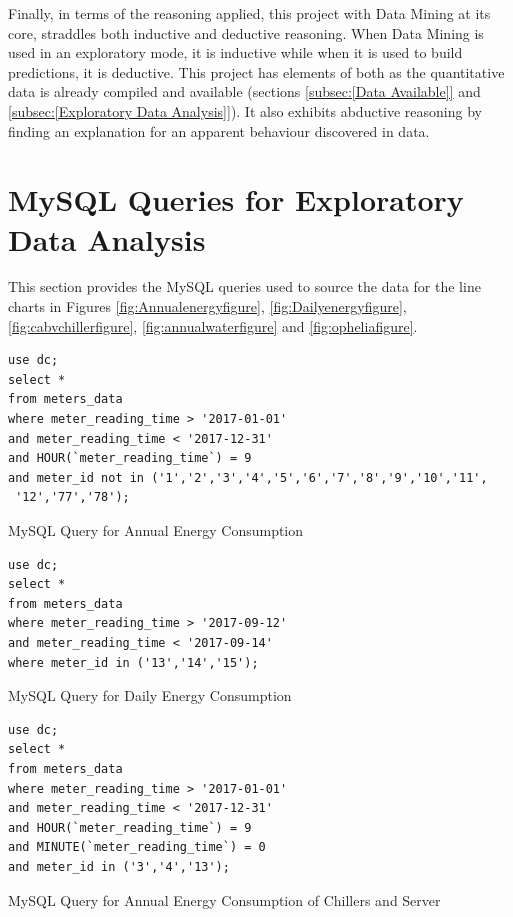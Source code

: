 \documentclass[12pt]{scrartcl}
\begin{document}
Finally, in terms of the reasoning applied, this project with Data Mining at its core, straddles both inductive and deductive reasoning. When Data Mining is used in an exploratory mode, it is inductive while when it is used to build predictions, it is deductive. This project has elements of both as the quantitative data is already compiled and available (sections \ref{subsec:[Data Available]} and \ref{subsec:[Exploratory Data Analysis]}). It also exhibits abductive reasoning by finding an explanation for an apparent behaviour discovered in data. 

\newpage
\printbibliography[heading=bibintoc]
\newpage
\glsaddall
\printglossary
\newpage
\appendix
\appendixpage
\addappheadtotoc

\section{MySQL Queries for Exploratory Data Analysis}
\label{sec:[MySQL Queries]}
This section provides the MySQL queries used to source the data for the line charts in Figures \ref{fig:Annualenergyfigure}, \ref{fig:Dailyenergyfigure}, \ref{fig:cabvchillerfigure}, \ref{fig:annualwaterfigure} and \ref{fig:opheliafigure}.


\begin{listing}[H]
\begin{verbatim}
use dc; 
select * 
from meters_data
where meter_reading_time > '2017-01-01'
and meter_reading_time < '2017-12-31'
and HOUR(`meter_reading_time`) = 9
and meter_id not in ('1','2','3','4','5','6','7','8','9','10','11',
 '12','77','78');
\end{verbatim}
\caption{MySQL Query for Annual Energy Consumption}
\label{list:[Annual Energy Consumption]}
\end{listing}

\begin{listing}[H]
\begin{verbatim}
use dc; 
select * 
from meters_data
where meter_reading_time > '2017-09-12'
and meter_reading_time < '2017-09-14'
where meter_id in ('13','14','15');
\end{verbatim}
\caption{MySQL Query for Daily Energy Consumption}
\label{list:[Daily Energy Consumption]}
\end{listing}

\begin{listing}[H]
\begin{verbatim}
use dc; 
select * 
from meters_data
where meter_reading_time > '2017-01-01'
and meter_reading_time < '2017-12-31'
and HOUR(`meter_reading_time`) = 9
and MINUTE(`meter_reading_time`) = 0
and meter_id in ('3','4','13');
\end{verbatim}
\caption{MySQL Query for Annual Energy Consumption of Chillers and Server}
\label{list:[MySQL Query for Annual Energy Consumption of Chillers and Server]}
\end{listing}
\end{document}
